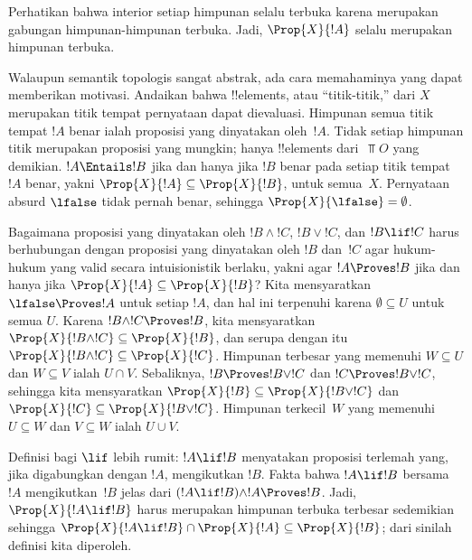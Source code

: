 \documentclass[../../../include/open-logic-section]{subfiles}
\begin{document}
Perhatikan bahwa interior setiap himpunan selalu terbuka karena merupakan
gabungan himpunan-himpunan terbuka. Jadi, $\Prop{X}{!A}$ selalu merupakan
himpunan terbuka.

Walaupun semantik topologis sangat abstrak, ada cara memahaminya yang dapat
memberikan motivasi. Andaikan bahwa !!{element}s, atau ``titik-titik,'' dari
$X$ merupakan titik tempat pernyataan dapat dievaluasi. Himpunan semua titik
tempat $!A$ benar ialah proposisi yang dinyatakan oleh~$!A$. Tidak setiap
himpunan titik merupakan proposisi yang mungkin; hanya !!{element}s
dari~$\Top{O}$ yang demikian. $!A\Entails !B$ jika dan hanya jika $!B$ benar
pada setiap titik tempat~$!A$ benar, yakni
$\Prop{X}{!A}\subseteq\Prop{X}{!B}$, untuk semua~$X$. Pernyataan absurd
$\lfalse$ tidak pernah benar, sehingga $\Prop{X}{\lfalse}=\emptyset$.

Bagaimana proposisi yang dinyatakan oleh $!B\land !C$, $!B\lor !C$, dan
$!B\lif !C$ harus berhubungan dengan proposisi yang dinyatakan oleh $!B$
dan~$!C$ agar hukum-hukum yang valid secara intuisionistik berlaku, yakni agar
$!A\Proves !B$ jika dan hanya jika
$\Prop{X}{!A}\subseteq\Prop{X}{!B}$? Kita mensyaratkan
$\lfalse\Proves !A$ untuk setiap $!A$, dan hal ini terpenuhi karena
$\emptyset\subseteq U$ untuk semua $U$. Karena $!B\land !C\Proves !B$, kita
mensyaratkan $\Prop{X}{!B\land !C}\subseteq\Prop{X}{!B}$, dan serupa dengan
itu $\Prop{X}{!B\land !C}\subseteq\Prop{X}{!C}$. Himpunan terbesar yang
memenuhi $W\subseteq U$ dan $W\subseteq V$ ialah $U\cap V$. Sebaliknya,
$!B\Proves !B\lor !C$ dan $!C\Proves !B\lor !C$, sehingga kita mensyaratkan
$\Prop{X}{!B}\subseteq\Prop{X}{!B\lor !C}$ dan
$\Prop{X}{!C}\subseteq\Prop{X}{!B\lor !C}$. Himpunan terkecil~$W$ yang
memenuhi $U\subseteq W$ dan $V\subseteq W$ ialah $U\cup V$.

Definisi bagi $\lif$ lebih rumit: $!A\lif !B$ menyatakan proposisi terlemah
yang, jika digabungkan dengan $!A$, mengikutkan $!B$. Fakta bahwa
$!A\lif !B$ bersama $!A$ mengikutkan~$!B$ jelas dari
$(!A\lif !B)\land !A\Proves !B$. Jadi, $\Prop{X}{!A\lif !B}$ harus merupakan
himpunan terbuka terbesar sedemikian sehingga
$\Prop{X}{!A\lif !B}\cap\Prop{X}{!A}\subseteq\Prop{X}{!B}$; dari sinilah
definisi kita diperoleh.
\end{document}
